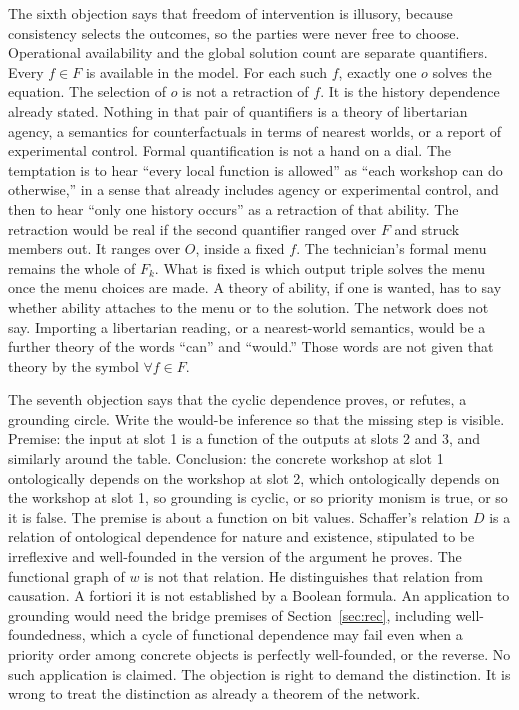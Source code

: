 \documentclass[12pt]{article}
\begin{document}
The sixth objection says that freedom of intervention is illusory, because consistency selects the outcomes, so the parties were never free to choose. Operational availability and the global solution count are separate quantifiers. Every \(f\in F\) is available in the model. For each such \(f\), exactly one \(o\) solves the equation. The selection of \(o\) is not a retraction of \(f\). It is the history dependence already stated. Nothing in that pair of quantifiers is a theory of libertarian agency, a semantics for counterfactuals in terms of nearest worlds, or a report of experimental control. Formal quantification is not a hand on a dial. The temptation is to hear ``every local function is allowed'' as ``each workshop can do otherwise,'' in a sense that already includes agency or experimental control, and then to hear ``only one history occurs'' as a retraction of that ability. The retraction would be real if the second quantifier ranged over \(F\) and struck members out. It ranges over \(O\), inside a fixed \(f\). The technician's formal menu remains the whole of \(F_k\). What is fixed is which output triple solves the menu once the menu choices are made. A theory of ability, if one is wanted, has to say whether ability attaches to the menu or to the solution. The network does not say. Importing a libertarian reading, or a nearest-world semantics, would be a further theory of the words ``can'' and ``would.'' Those words are not given that theory by the symbol \(\forall f\in F\).

The seventh objection says that the cyclic dependence proves, or refutes, a grounding circle. Write the would-be inference so that the missing step is visible. Premise: the input at slot 1 is a function of the outputs at slots 2 and 3, and similarly around the table. Conclusion: the concrete workshop at slot 1 ontologically depends on the workshop at slot 2, which ontologically depends on the workshop at slot 1, so grounding is cyclic, or so priority monism is true, or so it is false. The premise is about a function on bit values. Schaffer's relation \(D\) is a relation of ontological dependence for nature and existence, stipulated to be irreflexive and well-founded in the version of the argument he proves. The functional graph of \(w\) is not that relation. He distinguishes that relation from causation. A fortiori it is not established by a Boolean formula. An application to grounding would need the bridge premises of Section~\ref{sec:rec}, including well-foundedness, which a cycle of functional dependence may fail even when a priority order among concrete objects is perfectly well-founded, or the reverse. No such application is claimed. The objection is right to demand the distinction. It is wrong to treat the distinction as already a theorem of the network.
\end{document}
